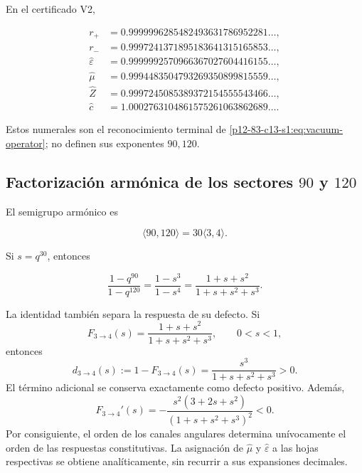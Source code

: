 En el certificado V2,

\begin{align*}
r_+&=0.9999996285482493631786952281\ldots,\\
r_-&=0.9997241371895183641315165853\ldots,\\
\widehat\varepsilon&=0.9999992570966367027604416155\ldots,\\
\widehat\mu&=0.9994483504793269350899815559\ldots,\\
\widehat Z&=0.9997245085389372154555543466\ldots,\\
\widehat c&=1.0002763104861575261063862689\ldots.
\end{align*}

Estos numerales son el reconocimiento terminal de \cref{p12-83-c13-s1:eq:vacuum-operator}; no definen sus exponentes \(90,120\).

\subsection{Factorizaci\'on arm\'onica de los sectores \texorpdfstring{\(90\)}{90} y \texorpdfstring{\(120\)}{120}}

El semigrupo arm\'onico es

\[
\langle90,120\rangle=30\langle3,4\rangle.
\]

Si \(s=q^{30}\), entonces

\begin{equation}
\frac{1-q^{90}}{1-q^{120}}
=\frac{1-s^3}{1-s^4}
=\frac{1+s+s^2}{1+s+s^2+s^3}.
\label{p12-83-c13-s1:eq:three-four-completion}
\end{equation}

La identidad tambi\'en separa la respuesta de su defecto. Si
\[
F_{3\to4}(s)=\frac{1+s+s^2}{1+s+s^2+s^3},
\qquad 0<s<1,
\]
entonces
\begin{equation}
d_{3\to4}(s):=1-F_{3\to4}(s)
=\frac{s^3}{1+s+s^2+s^3}>0.
\label{p12-83-c13-s1:eq:vacuum-defect34}
\end{equation}
El t\'ermino adicional se conserva exactamente como defecto
positivo. Adem\'as,
\begin{equation}
F_{3\to4}'(s)
=-\frac{s^2(3+2s+s^2)}{(1+s+s^2+s^3)^2}<0.
\label{p12-83-c13-s1:eq:vacuum-monotonic34}
\end{equation}
Por consiguiente, el orden de los canales angulares determina un\'ivocamente
el orden de las respuestas constitutivas. La asignaci\'on de
\(\widehat\mu\) y \(\widehat\varepsilon\) a las hojas respectivas se obtiene
anal\'iticamente, sin recurrir a sus expansiones decimales.

